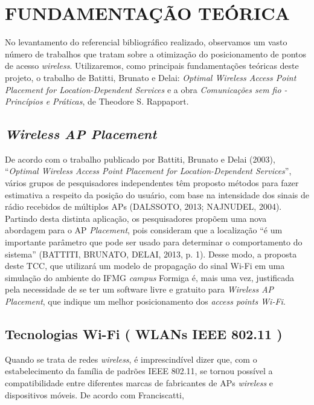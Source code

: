 \documentclass[
	12pt,				%
	openright,			%
	twoside,			%
	a4paper,			%
	english,			%
	french,				%
	spanish,			%
	brazil				%
	]{abntex2}
\begin{document}
\chapter[FUNDAMENTAÇÃO TEÓRICA]{FUNDAMENTAÇÃO TEÓRICA}

No levantamento do referencial bibliográfico realizado, observamos um vasto número de trabalhos que tratam sobre a otimização do posicionamento de pontos de acesso \textit{wireless}. Utilizaremos, como principais fundamentações teóricas deste projeto, o trabalho de Batitti, Brunato e Delai: \textit{Optimal Wireless Access Point Placement for Location-Dependent Services} e a obra \textit{Comunicações sem fio - Princípios e Práticas}, de Theodore S. Rappaport.

\section[Wireless AP Placement]{\textit{Wireless AP Placement}}

De acordo com o trabalho publicado por Battiti, Brunato e Delai (2003), “\textit{Optimal Wireless Access Point Placement for Location-Dependent Services}”, vários grupos de pesquisadores independentes têm proposto métodos para fazer estimativa a respeito da posição do usuário, com base na intensidade dos sinais de rádio recebidos de múltiplos APs (DALSSOTO, 2013; NAJNUDEL, 2004). Partindo desta distinta aplicação, os pesquisadores propõem uma nova abordagem para o AP \textit{Placement}, pois consideram que a localização “é um importante parâmetro que pode ser usado para determinar o comportamento do sistema” (BATTITI, BRUNATO, DELAI, 2013, p. 1). Desse modo, a proposta deste TCC, que utilizará um modelo de propagação do sinal Wi-Fi em uma simulação do ambiente do IFMG \textit{campus} Formiga é, mais uma vez, justificada pela necessidade de se ter um software livre e gratuito para \textit{Wireless AP Placement}, que indique um melhor posicionamento dos \textit{access points Wi-Fi}.

\section[Tecnologias Wi-Fi ( WLANs IEEE 802.11 )]{Tecnologias Wi-Fi ( WLANs IEEE 802.11 )}

Quando se trata de redes \textit{wireless}, é imprescindível dizer que, com o estabelecimento da família de padrões IEEE 802.11, se tornou possível a compatibilidade entre diferentes marcas de fabricantes de APs \textit{wireless} e dispositivos móveis. De acordo com Franciscatti,
\end{document}
